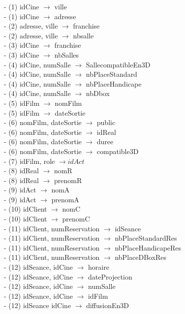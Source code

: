 \documentclass[a4paper,sffamily,12pt]{article}
\begin{document}
				\noindent- (1) idCine $\rightarrow$ ville \\
				- (1) idCine $\rightarrow$ adresse \\
				- (2) adresse, ville $\rightarrow$ franchise \\
				- (2) adresse, ville $\rightarrow$ nbsalle \\
				- (3) idCine $\rightarrow$ franchise \\
				- (3) idCine $\rightarrow$ nbSalles \\
				- (4) idCine, numSalle $\rightarrow$ SallecompatibleEn3D \\
		 		- (4) idCine, numSalle $\rightarrow$ nbPlaceStandard \\
		 		- (4) idCine, numSalle $\rightarrow$ nbPlaceHandicape \\
		 		- (4) idCine, numSalle $\rightarrow$ nbDbox \\
		 		- (5) idFilm $\rightarrow$ nomFilm \\
		 		- (5) idFilm $\rightarrow$ dateSortie \\				 		
				- (6) nomFilm, dateSortie $\rightarrow$ public \\
				- (6) nomFilm, dateSortie $\rightarrow$ idReal \\
				- (6) nomFilm, dateSortie $\rightarrow$ duree \\
				- (6) nomFilm, dateSortie $\rightarrow$ compatible3D \\
				- (7) idFilm, role $\rightarrow idAct$ \\
				- (8) idReal $\rightarrow$ nomR \\
				- (8) idReal $\rightarrow$ prenomR \\						
				- (9) idAct $\rightarrow$ nomA \\
				- (9) idAct $\rightarrow$ prenomA \\						
				- (10) idClient $\rightarrow$ nomC \\
				- (10) idClient $\rightarrow$ prenomC \\						
				- (11) idClient, numReservation $\rightarrow$ idSeance \\
				- (11) idClient, numReservation $\rightarrow$ nbPlaceStandardRes \\
				- (11) idClient, numReservation $\rightarrow$ nbPlaceHandicapeRes \\
				- (11) idClient, numReservation $\rightarrow$ nbPlaceDBoxRes \\
				- (12) idSeance, idCine $\rightarrow$ horaire \\
				- (12) idSeance, idCine $\rightarrow$ dateProjection \\
				- (12) idSeance, idCine $\rightarrow$ numSalle \\
				- (12) idSeance, idCine $\rightarrow$ idFilm \\
				- (12) idSeance  idCine $\rightarrow$ diffusionEn3D \\
		
\end{document}
